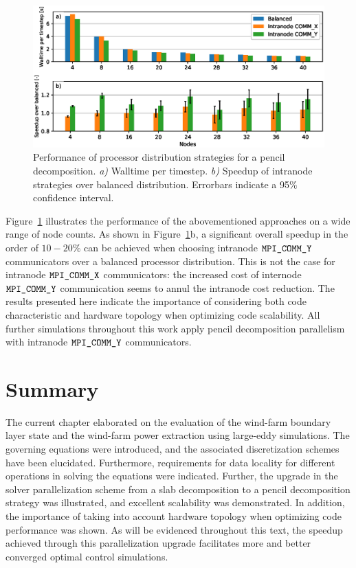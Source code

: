 \begin{figure}
	\includegraphics[width=\textwidth]{figures/meth_balanced_intranode.eps}
	\caption{Performance of processor distribution strategies for a pencil decomposition. \emph{a)} Walltime per timestep. \emph{b)} Speedup of intranode strategies over  balanced distribution. Errorbars indicate a 95$\%$ confidence interval. \label{fig:balanced_intranode}}
\end{figure}

Figure~\ref{fig:balanced_intranode} illustrates the performance of the abovementioned approaches on a wide range of node counts. As shown in Figure~\ref{fig:balanced_intranode}b, a significant overall speedup in the order of $10 - 20\%$ can be achieved when choosing intranode $\verb|MPI_COMM_Y|$ communicators over a balanced processor distribution. This is not the case for intranode $\verb|MPI_COMM_X|$ communicators: the increased cost of internode $\verb|MPI_COMM_Y|$ communication seems to annul the intranode cost reduction. The results presented here indicate the importance of considering both code characteristic and hardware topology when optimizing code scalability. All further simulations throughout this work apply pencil decomposition parallelism with intranode $\verb|MPI_COMM_Y|$ communicators.

\section{Summary}
The current chapter elaborated on the evaluation of the wind-farm boundary layer state and the wind-farm power extraction using large-eddy simulations. The governing equations were introduced, and the associated discretization schemes have been elucidated. Furthermore, requirements for data locality for different operations in solving the equations were indicated. Further, the upgrade in the solver parallelization scheme from a slab decomposition to a pencil decomposition strategy was illustrated, and excellent scalability was demonstrated. In addition, the importance of taking into account hardware topology when optimizing code performance was shown.  As will be evidenced throughout this text, the speedup achieved through this parallelization upgrade facilitates more and better converged optimal control simulations. 


